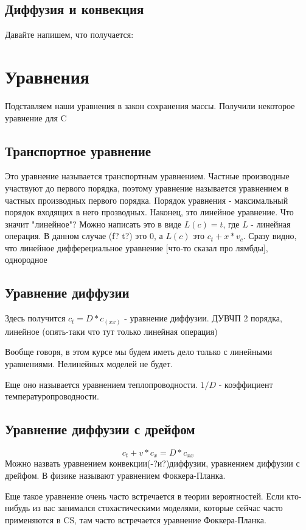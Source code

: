 \subsection{Диффузия и конвекция}


Давайте напишем, что получается:

\section{Уравнения}
Подставляем наши уравнения в закон сохранения массы. Получили некоторое уравнение для C

\subsection{Транспортное уравнение}
Это уравнение называется транспортным уравнением. Частные производные участвуют до первого порядка, поэтому уравнение называется уравнением в частных производных первого порядка. Порядок уравнения - максимальный порядок входящих в него прозводных. Наконец, это линейное уравнение.
Что значит "линейное"? Можно написать это в виде $L(c) = t$, где $L$ - линейная операция. В данном случае (f? t?) это 0, а $L(c)$ это $c_t + x*v_c$. Сразу видно, что линейное дифферециальное уравнение [что-то сказал про лямбды], однородное

\subsection{Уравнение диффузии}
Здесь получится $c_t = D * c_(xx)$ - уравнение диффузии. ДУВЧП 2 порядка, линейное (опять-таки что тут только линейная операция)

Вообще говоря, в этом курсе мы будем иметь дело только с линейными уравнениями. Нелинейных моделей не будет.

Еще оно называется уравнением теплопроводности. $1/D$ - коэффициент температуропроводности.

\subsection{Уравнение диффузии с дрейфом}
$$c_t + v * c_x = D * c_{xx}$$
Можно назвать уравнением конвекции(-?и?)диффузии, уравнением диффузии с дрейфом. В физике называют уравнением Фоккера-Планка.

Еще такое уравнение очень часто встречается в теории вероятностей. Если кто-нибудь из вас занимался стохастическими моделями, которые сейчас часто применяются в CS, там часто встречается уравнение Фоккера-Планка.



